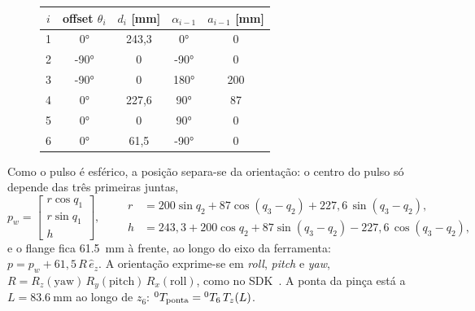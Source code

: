 \begin{figure}[H]
\centering
\begin{minipage}[c]{0.44\textwidth}
\centering
{}
\label{fig:frames}
\end{minipage}\hfill
\begin{minipage}[c]{0.52\textwidth}
\centering
\small
{}
\label{tab:dh}
\begin{tabular}{@{}ccccc@{}}
\toprule
\rowcolor{tabcab}
$i$ & offset $\theta_i$ & $d_i$ [mm] & $\alpha_{i-1}$ & $a_{i-1}$ [mm] \\
\midrule
1 & \ang{0}   & 243,3 & \ang{0}   & 0 \\
2 & \ang{-90} & 0     & \ang{-90} & 0 \\
3 & \ang{-90} & 0     & \ang{180} & 200 \\
4 & \ang{0}   & 227,6 & \ang{90}  & 87 \\
5 & \ang{0}   & 0     & \ang{90}  & 0 \\
6 & \ang{0}   & 61,5  & \ang{-90} & 0 \\
\bottomrule
\end{tabular}
\end{minipage}
\end{figure}

Como o pulso é esférico, a posição separa-se da orientação: o centro do pulso
só depende das três primeiras juntas,
\begin{equation}
p_w = \begin{bmatrix} r\cos q_1\\ r\sin q_1\\ h \end{bmatrix},\qquad
\begin{aligned}
r &= 200\sin q_2 + 87\cos(q_3-q_2) + 227{,}6\,\sin(q_3-q_2),\\
h &= 243{,}3 + 200\cos q_2 + 87\sin(q_3-q_2) - 227{,}6\,\cos(q_3-q_2),
\end{aligned}
\label{eq:pulso}
\end{equation}
e o flange fica \SI{61.5}{\milli\meter} à frente, ao longo do eixo da
ferramenta: $p = p_w + 61{,}5\,R\,\hat e_z$. A orientação exprime-se em
\emph{roll}, \emph{pitch} e \emph{yaw},
$R = R_z(\text{yaw})\,R_y(\text{pitch})\,R_x(\text{roll})$, como no
SDK~\cite{xarm_sdk}. A ponta da pinça está a $L = \SI{83.6}{\milli\meter}$
ao longo de $z_6$: ${}^{0}T_{\text{ponta}} = {}^{0}T_{6}\,T_z(L)$.

